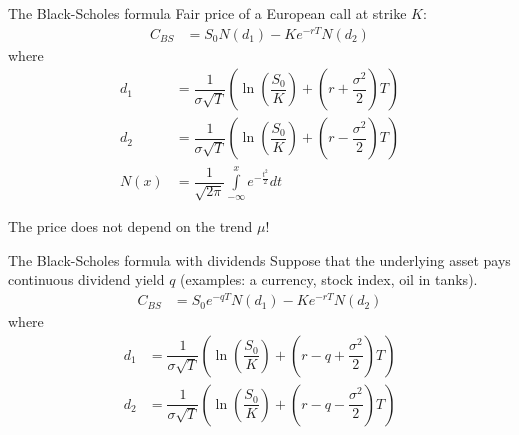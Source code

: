 \documentclass{beamer}
\begin{document}
\begin{frame}{The Black-Scholes formula}
\justify
Fair price of a European call at strike $K$:
\begin{align*}
C_{BS} &= S_0N(d_1) - Ke^{-rT}N(d_2)
\end{align*}
where
\begin{align*}
d_1 &= \dfrac{1}{\sigma\sqrt{T}}\left( \ln\left(\dfrac{S_0}{K}\right) + \left(r + \dfrac{\sigma^2}{2}\right)T\right) \\
d_2 &= \dfrac{1}{\sigma\sqrt{T}}\left( \ln\left(\dfrac{S_0}{K}\right) + \left(r - \dfrac{\sigma^2}{2}\right)T\right) \\
N(x) &= \dfrac{1}{\sqrt{2\pi}}\int\limits_{-\infty}^x e^{-\frac{t^2}{2}}dt
\end{align*}

\justify
The price does not depend on the trend  $\mu$!
\end{frame}



\begin{frame}{The Black-Scholes formula with dividends}
\justify
Suppose that the underlying asset pays continuous dividend yield $q$ (examples: a currency, stock index, oil in tanks).
\begin{align*}
C_{BS} &= S_0e^{-qT}N(d_1) - Ke^{-rT}N(d_2)
\end{align*}
where
\begin{align*}
d_1 &= \dfrac{1}{\sigma\sqrt{T}}\left( \ln\left(\dfrac{S_0}{K}\right) + \left(r -q + \dfrac{\sigma^2}{2}\right)T\right) \\
d_2 &= \dfrac{1}{\sigma\sqrt{T}}\left( \ln\left(\dfrac{S_0}{K}\right) + \left(r -q- \dfrac{\sigma^2}{2}\right)T\right)
\end{align*}
\end{frame}
\end{document}
